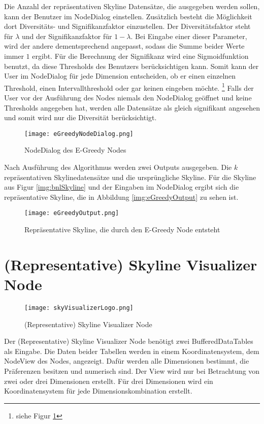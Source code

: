 Die Anzahl der repräsentativen Skyline Datensätze, die ausgegeben werden sollen, kann der Benutzer im NodeDialog einstellen. Zusätzlich besteht die Möglichkeit dort Diversitäts- und Signifikanzfaktor einzustellen. Der Diversitätsfaktor steht für $\lambda$ und der Signifikanzfaktor für $1-\lambda$. Bei Eingabe einer dieser Parameter, wird der andere dementsprechend angepasst, sodass die Summe beider Werte immer $1$ ergibt.
Für die Berechnung der Signifikanz wird eine Sigmoidfunktion benutzt, da diese Thresholds des Benutzers berücksichtigen kann. Somit kann der User im NodeDialog für jede Dimension entscheiden, ob er einen einzelnen Threshold, einen Intervallthreshold oder gar keinen eingeben möchte. \footnote{siehe Figur \ref{img:eGreedyNodeDialog}} Falls der User vor der Ausführung des Nodes niemals den NodeDialog geöffnet und keine Thresholds angegeben hat, werden alle Datensätze als gleich signifikant angesehen und somit wird nur die Diversität berücksichtigt. 

\begin{figure}[H]
	\centering
	\texttt{[image: eGreedyNodeDialog.png]}
	\caption{NodeDialog des E-Greedy Nodes}
	\label{img:eGreedyNodeDialog}
\end{figure}

Nach Ausführung des Algorithmus werden zwei Outputs ausgegeben. Die $k$ repräsentativen Skylinedatensätze und die ursprüngliche Skyline. Für die Skyline aus Figur \ref{img:bnlSkyline} und der Eingaben im NodeDialog ergibt sich die repräsentative Skyline, die in Abbildung \ref{img:eGreedyOutput} zu sehen ist.

\begin{figure}[H]
	\centering
	\texttt{[image: eGreedyOutput.png]}
	\caption{Repräsentative Skyline, die durch den E-Greedy Node entsteht}
	\label{img:eGreedyOut}
\end{figure}
\section{(Representative) Skyline Visualizer Node}
\label{ch:Implementierung:sec:skyVisualizer}
\begin{figure}[H]
	\centering
	\texttt{[image: skyVisualizerLogo.png]}
	\caption{(Representative) Skyline Visualizer Node}
	\label{img:skyVisualizerLogo}
\end{figure}

Der (Representative) Skyline Visualizer Node benötigt zwei BufferedDataTables als Eingabe. Die Daten beider Tabellen werden in einem Koordinatensystem, dem NodeView des Nodes, angezeigt. Dafür werden alle Dimensionen bestimmt, die Präferenzen besitzen und numerisch sind. Der View wird nur bei Betrachtung von zwei oder drei Dimensionen erstellt. Für drei Dimensionen wird ein Koordinatensystem für jede Dimensionskombination erstellt.

